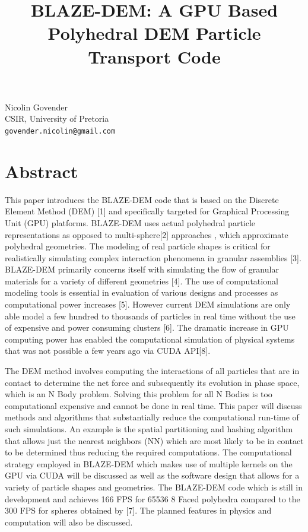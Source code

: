 \documentclass[article, A4, 11pt]{llncs}%
\begin{document}
\title{BLAZE-DEM: A GPU Based Polyhedral DEM Particle Transport Code}
 \author{} \institute{}
\maketitle
\begin{center}
{\large Nicolin Govender}\\
CSIR, University of Pretoria\\
{\tt govender.nicolin@gmail.com}
\end{center}

\section*{Abstract}
This paper introduces the BLAZE-DEM code that is based on the Discrete Element Method (DEM) [1] and specifically targeted for Graphical Processing Unit (GPU) platforms. BLAZE-DEM uses actual polyhedral particle representations as opposed to multi-sphere[2] approaches , which approximate polyhedral geometries. The modeling of real particle shapes is critical for realistically simulating complex interaction phenomena in granular assemblies [3]. BLAZE-DEM primarily concerns itself with simulating the flow of granular materials for a variety of different geometries [4]. The use of computational modeling tools is essential in  evaluation of various designs and processes as computational power increases [5]. However current DEM simulations are only able model a few hundred to thousands of particles in real time without the use of expensive and power consuming clusters [6]. The dramatic increase in GPU computing power has enabled the computational simulation of physical systems that was not possible a few years ago via CUDA API[8].

The DEM method involves computing the interactions of all particles that are in contact to determine the net force and subsequently its evolution in phase space, which is an N Body problem. Solving this problem for all N Bodies is too computational expensive and cannot be done in real time. This paper will discuss methods and algorithms that substantially reduce the computational run-time of such simulations. An example is the spatial partitioning and hashing algorithm that allows just the nearest neighbors (NN) which are most likely to be in contact to be determined thus reducing the required computations. The computational strategy employed in BLAZE-DEM which makes use of multiple kernels on the GPU via CUDA will be discussed as well as the software design that allows for a variety of particle shapes and geometries. The BLAZE-DEM code which is still in development and achieves 166 FPS for 65536 8 Faced polyhedra compared to the 300 FPS for spheres obtained by [7]. The planned features in physics and computation will also be discussed.
\end{document}
